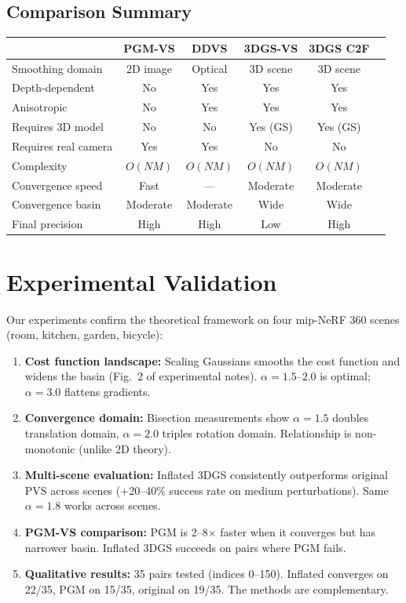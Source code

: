 \documentclass[11pt]{article}
\begin{document}
\subsection{Comparison Summary}

\begin{center}
\renewcommand{\arraystretch}{1.3}
\begin{tabular}{lccccc}
\toprule
& \textbf{PGM-VS} & \textbf{DDVS} & \textbf{3DGS-VS} & \textbf{3DGS C2F} \\
\midrule
Smoothing domain & 2D image & Optical & 3D scene & 3D scene \\
Depth-dependent & No & Yes & Yes & Yes \\
Anisotropic & No & Yes & Yes & Yes \\
Requires 3D model & No & No & Yes (GS) & Yes (GS) \\
Requires real camera & Yes & Yes & No & No \\
Complexity & $O(NM)$ & $O(NM)$ & $O(NM)$ & $O(NM)$ \\
Convergence speed & Fast & --- & Moderate & Moderate \\
Convergence basin & Moderate & Moderate & Wide & Wide \\
Final precision & High & High & Low & High \\
\bottomrule
\end{tabular}
\end{center}

\section{Experimental Validation}
\label{sec:results}

Our experiments confirm the theoretical framework on four mip-NeRF 360 scenes (room, kitchen, garden, bicycle):

\begin{enumerate}
    \item \textbf{Cost function landscape:} Scaling Gaussians smooths the cost function and widens the basin (Fig.~2 of experimental notes). $\alpha = 1.5$--$2.0$ is optimal; $\alpha = 3.0$ flattens gradients.

    \item \textbf{Convergence domain:} Bisection measurements show $\alpha = 1.5$ doubles translation domain, $\alpha = 2.0$ triples rotation domain. Relationship is non-monotonic (unlike 2D theory).

    \item \textbf{Multi-scene evaluation:} Inflated 3DGS consistently outperforms original PVS across scenes (+20--40\% success rate on medium perturbations). Same $\alpha = 1.8$ works across scenes.

    \item \textbf{PGM-VS comparison:} PGM is 2--8$\times$ faster when it converges but has narrower basin. Inflated 3DGS succeeds on pairs where PGM fails.

    \item \textbf{Qualitative results:} 35 pairs tested (indices 0--150). Inflated converges on 22/35, PGM on 15/35, original on 19/35. The methods are complementary.
\end{enumerate}
\end{document}
